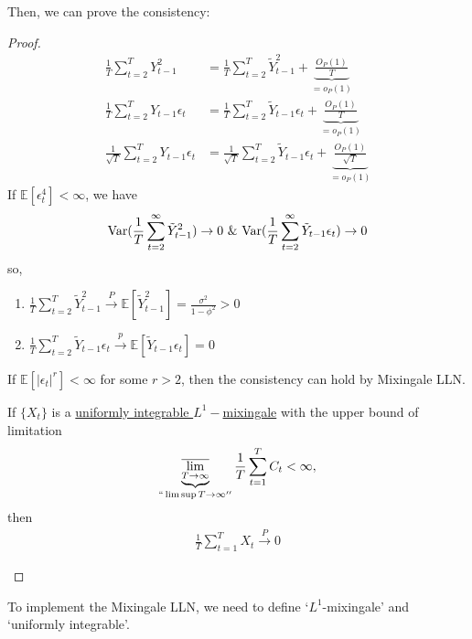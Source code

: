 \documentclass[11pt]{elegantbook}
\begin{document}
Then, we can prove the consistency:
\begin{proof}
    \begin{equation}
        \begin{aligned}
            \frac{1}{T}\sum_{t=2}^T Y_{t-1}^2&=\frac{1}{T}\sum_{t=2}^T \tilde{Y}_{t-1}^2+\underbrace{\frac{O_P(1)}{T}}_{=o_P(1)}\\
            \frac{1}{T}\sum_{t=2}^T Y_{t-1}\epsilon_t&=\frac{1}{T}\sum_{t=2}^T \tilde{Y}_{t-1}\epsilon_t+\underbrace{\frac{O_P(1)}{T}}_{=o_P(1)}\\
            \frac{1}{\sqrt{T}}\sum_{t=2}^T Y_{t-1}\epsilon_t&=\frac{1}{\sqrt{T}}\sum_{t=2}^T \tilde{Y}_{t-1}\epsilon_t+\underbrace{\frac{O_P(1)}{\sqrt{T}}}_{=o_P(1)}
        \end{aligned}
        \nonumber
    \end{equation}
    If $\mathbb{E}[\epsilon_t^4]<\infty$, we have
    \begin{equation}
        \begin{aligned}
            \textnormal{Var}(\frac{1}{T}\sum_{t=2}^\infty\tilde{Y}_{t-1}^2) \rightarrow 0\ \& \ \textnormal{Var}(\frac{1}{T}\sum_{t=2}^\infty\tilde{Y}_{t-1}\epsilon_t) \rightarrow 0
        \end{aligned}
        \nonumber
    \end{equation}
    so,
    \begin{enumerate}
        \item $\frac{1}{T}\sum_{t=2}^T \tilde{Y}_{t-1}^2 \stackrel{P}{\longrightarrow} \mathbb{E}[\tilde{Y}_{t-1}^2]=\frac{\sigma^2}{1-\phi^2}>0$
        \item $\frac{1}{T}\sum_{t=2}^T \tilde{Y}_{t-1}\epsilon_t \stackrel{p}{\rightarrow} \mathbb{E}[\tilde{Y}_{t-1}\epsilon_t]=0$
    \end{enumerate}
    \begin{note}
        If $\mathbb{E}[|\epsilon_t|^r]<\infty$ for some $r>2$, then the consistency can hold by Mixingale LLN.
    \end{note}
    \begin{theorem}
        If $\{X_t\}$ is a \underline{uniformly integrable $L^1-$mixingale} with the upper bound of limitation
        \begin{equation}
            \begin{aligned}
                \underbrace{\overline{\lim_{T \rightarrow \infty}}}_{``\lim\sup T \rightarrow \infty''}\frac{1}{T}\sum_{t=1}^T C_t<\infty,
            \end{aligned}
            \nonumber
        \end{equation}
        then
        \begin{equation}
            \begin{aligned}
                \frac{1}{T}\sum_{t=1}^T X_t \stackrel{P}{\longrightarrow} 0
            \end{aligned}
            \nonumber
        \end{equation}
    \end{theorem}
\end{proof}
To implement the Mixingale LLN, we need to define `$L^1$-mixingale' and `uniformly integrable'.
\end{document}
